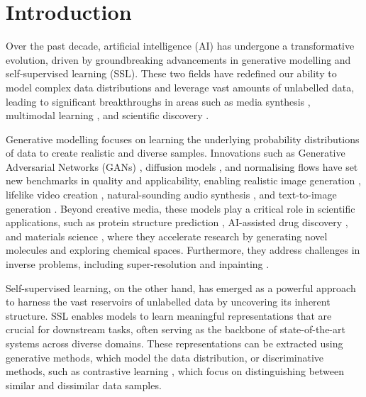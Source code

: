 
\chapter{Introduction}

Over the past decade, artificial intelligence (AI) has undergone a transformative evolution, driven by groundbreaking advancements in generative modelling and self-supervised learning (SSL). These two fields have redefined our ability to model complex data distributions and leverage vast amounts of unlabelled data, leading to significant breakthroughs in areas such as media synthesis \cite{karras2019style, ramesh2021zero, esser2021taming, kong2020diffwave}, multimodal learning \cite{radford2021learning, xu2021videoclip, wang2022image}, and scientific discovery \cite{jumper2021highly, stokes2020deep, rives2021biological, zhang2021unified}.

Generative modelling focuses on learning the underlying probability distributions of data to create realistic and diverse samples. Innovations such as Generative Adversarial Networks (GANs) \cite{goodfellow2014generative}, diffusion models \cite{ho2020denoising, song2021score}, and normalising flows \cite{rezende2015variational, papamakarios2019normalizing} have set new benchmarks in quality and applicability, enabling realistic image generation \cite{karras2019style}, lifelike video creation \cite{esser2021taming}, natural-sounding audio synthesis \cite{kong2020diffwave}, and text-to-image generation \cite{ramesh2021zero}. Beyond creative media, these models play a critical role in scientific applications, such as protein structure prediction \cite{jumper2021highly, baek2021accurate}, AI-assisted drug discovery \cite{stokes2020deep, gentile2020deep}, and materials science \cite{butler2018machine}, where they accelerate research by generating novel molecules and exploring chemical spaces. Furthermore, they address challenges in inverse problems, including super-resolution \cite{saharia2022image, wang2024sinsr} and inpainting \cite{suvorov2022resolution, lugmayr2022repaint}.

Self-supervised learning, on the other hand, has emerged as a powerful approach to harness the vast reservoirs of unlabelled data by uncovering its inherent structure. SSL enables models to learn meaningful representations that are crucial for downstream tasks, often serving as the backbone of state-of-the-art systems across diverse domains. These representations can be extracted using generative methods, which model the data distribution, or discriminative methods, such as contrastive learning \cite{chen2020simple}, which focus on distinguishing between similar and dissimilar data samples.

